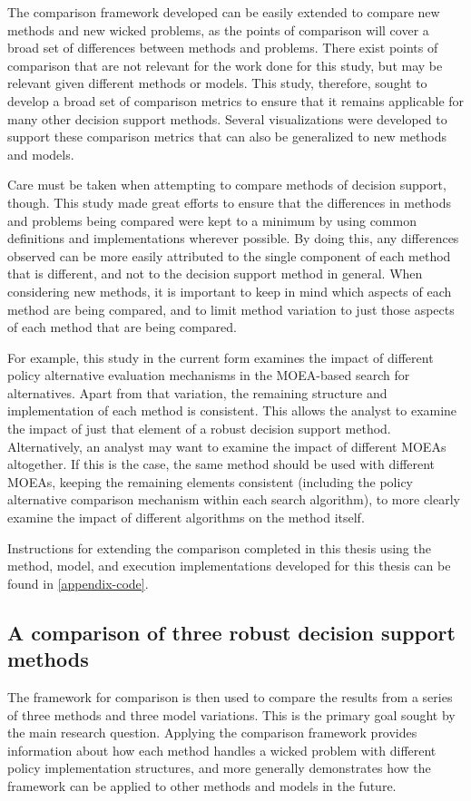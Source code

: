     The comparison framework developed can be easily extended to compare new methods and new wicked problems, as the points of comparison will cover a broad set of differences between methods and problems. There exist points of comparison that are not relevant for the work done for this study, but may be relevant given different methods or models. This study, therefore, sought to develop a broad set of comparison metrics to ensure that it remains applicable for many other decision support methods. Several visualizations were developed to support these comparison metrics that can also be generalized to new methods and models.
    
    Care must be taken when attempting to compare methods of decision support, though. This study made great efforts to ensure that the differences in methods and problems being compared were kept to a minimum by using common definitions and implementations wherever possible. By doing this, any differences observed can be more easily attributed to the single component of each method that is different, and not to the decision support method in general. When considering new methods, it is important to keep in mind which aspects of each method are being compared, and to limit method variation to just those aspects of each method that are being compared. 
    
    For example, this study in the current form examines the impact of different policy alternative evaluation mechanisms in the MOEA-based search for alternatives. Apart from that variation, the remaining structure and implementation of each method is consistent. This allows the analyst to examine the impact of just that element of a robust decision support method. Alternatively, an analyst may want to examine the impact of different MOEAs altogether. If this is the case, the same method should be used with different MOEAs, keeping the remaining elements consistent (including the policy alternative comparison mechanism within each search algorithm), to more clearly examine the impact of different algorithms on the method itself.
    
    Instructions for extending the comparison completed in this thesis using the method, model, and execution implementations developed for this thesis can be found in \cref{appendix-code}. 
        
    \subsection{A comparison of three robust decision support methods}
    The framework for comparison is then used to compare the results from a series of three methods and three model variations. This is the primary goal sought by the main research question. Applying the comparison framework provides information about how each method handles a wicked problem with different policy implementation structures, and more generally demonstrates how the framework can be applied to other methods and models in the future. 
    
